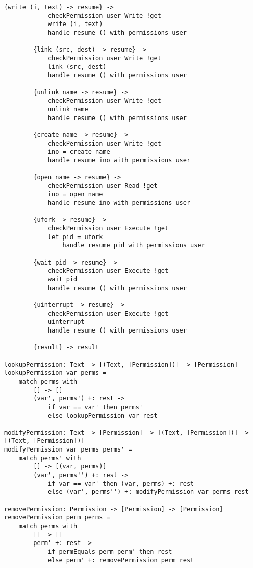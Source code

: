\documentclass[logo,bsc,singlespacing,parskip]{infthesis}
\begin{document}
\begin{lstlisting}[language=unison]
        {write (i, text) -> resume} -> 
            checkPermission user Write !get
            write (i, text)
            handle resume () with permissions user
        
        {link (src, dest) -> resume} -> 
            checkPermission user Write !get
            link (src, dest)
            handle resume () with permissions user
        
        {unlink name -> resume} ->
            checkPermission user Write !get
            unlink name
            handle resume () with permissions user

        {create name -> resume} -> 
            checkPermission user Write !get
            ino = create name
            handle resume ino with permissions user

        {open name -> resume} ->
            checkPermission user Read !get
            ino = open name
            handle resume ino with permissions user

        {ufork -> resume} ->
            checkPermission user Execute !get
            let pid = ufork
                handle resume pid with permissions user

        {wait pid -> resume} ->
            checkPermission user Execute !get
            wait pid
            handle resume () with permissions user

        {uinterrupt -> resume} ->
            checkPermission user Execute !get
            uinterrupt
            handle resume () with permissions user

        {result} -> result

lookupPermission: Text -> [(Text, [Permission])] -> [Permission]
lookupPermission var perms =
    match perms with
        [] -> []
        (var', perms') +: rest ->
            if var == var' then perms'
            else lookupPermission var rest

modifyPermission: Text -> [Permission] -> [(Text, [Permission])] -> [(Text, [Permission])]
modifyPermission var perms perms' =
    match perms' with
        [] -> [(var, perms)]
        (var', perms'') +: rest ->
            if var == var' then (var, perms) +: rest
            else (var', perms'') +: modifyPermission var perms rest

removePermission: Permission -> [Permission] -> [Permission]
removePermission perm perms =
    match perms with
        [] -> []
        perm' +: rest ->
            if permEquals perm perm' then rest
            else perm' +: removePermission perm rest


\end{lstlisting}
\end{document}
